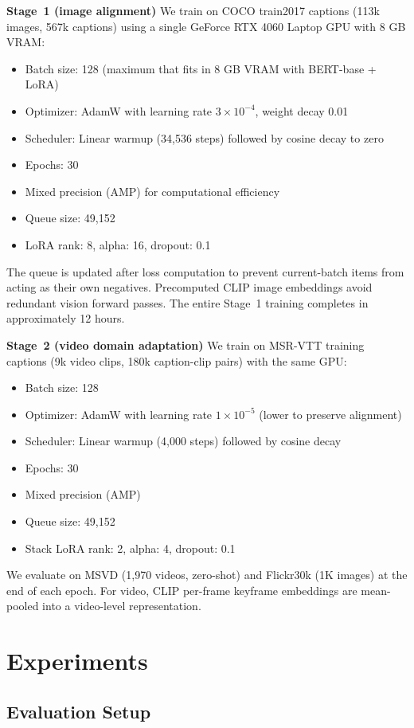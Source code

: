 \documentclass[10pt,leqno]{amsart}
\begin{document}
\textbf{Stage~1 (image alignment)} We train on COCO train2017 captions (113k images, 567k captions) using a single GeForce RTX 4060 Laptop GPU with 8 GB VRAM:
\begin{itemize}
    \item Batch size: 128 (maximum that fits in 8 GB VRAM with BERT-base + LoRA)
    \item Optimizer: AdamW with learning rate $3\times 10^{-4}$, weight decay 0.01
    \item Scheduler: Linear warmup (34,536 steps) followed by cosine decay to zero
    \item Epochs: 30
    \item Mixed precision (AMP) for computational efficiency
    \item Queue size: 49,152
    \item LoRA rank: 8, alpha: 16, dropout: 0.1
\end{itemize}
The queue is updated after loss computation to prevent current-batch items from acting as their own negatives. Precomputed CLIP image embeddings avoid redundant vision forward passes. The entire Stage~1 training completes in approximately 12 hours.

\textbf{Stage~2 (video domain adaptation)} We train on MSR-VTT training captions (9k video clips, 180k caption-clip pairs) with the same GPU:
\begin{itemize}
    \item Batch size: 128
    \item Optimizer: AdamW with learning rate $1\times 10^{-5}$ (lower to preserve alignment)
    \item Scheduler: Linear warmup (4,000 steps) followed by cosine decay
    \item Epochs: 30
    \item Mixed precision (AMP)
    \item Queue size: 49,152
    \item Stack LoRA rank: 2, alpha: 4, dropout: 0.1
\end{itemize}
We evaluate on MSVD (1,970 videos, zero-shot) and Flickr30k (1K images) at the end of each epoch. For video, CLIP per-frame keyframe embeddings are mean-pooled into a video-level representation.

\section{Experiments}

\subsection{Evaluation Setup}
\end{document}

